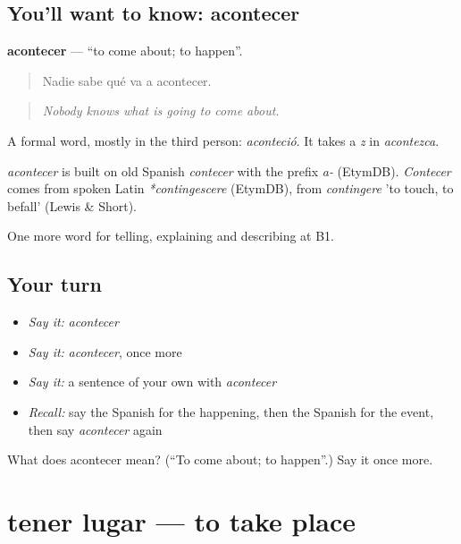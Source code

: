 \subsection*{You'll want to know: acontecer}
\textbf{acontecer} — \textquotedblleft{}to come about; to happen\textquotedblright{}.

\begin{quote}
Nadie sabe qué va a acontecer.
\end{quote}

\begin{quote}
\emph{Nobody knows what is going to come about.}
\end{quote}

A formal word, mostly in the third person: \emph{aconteció}. It takes a \emph{z} in \emph{acontezca}.

\begin{cousinweb}
\emph{acontecer} is built on old Spanish \emph{contecer} with the prefix \emph{a-} (EtymDB). \emph{Contecer} comes from spoken Latin \emph{*contingescere} (EtymDB), from \emph{contingere} 'to touch, to befall' (Lewis \& Short).
\end{cousinweb}

\begin{grammarlens}[title={What you've built}]
One more word for telling, explaining and describing at B1.
\end{grammarlens}

\subsection*{Your turn}
\begin{itemize}
\raggedright
  \item \emph{Say it:} \emph{acontecer}
  \item \emph{Say it:} \emph{acontecer}, once more
  \item \emph{Say it:} a sentence of your own with \emph{acontecer}
  \item \emph{Recall:} say the Spanish for the happening, then the Spanish for the event, then say \emph{acontecer} again
\end{itemize}

\begin{tcolorbox}[breakable,colback=teal!4,colframe=teal!35!black,title={Before you move on}]
What does acontecer mean? (\textquotedblleft{}To come about; to happen\textquotedblright{}.) Say it once more.
\end{tcolorbox}
\section[tener lugar]{tener lugar — to take place}


